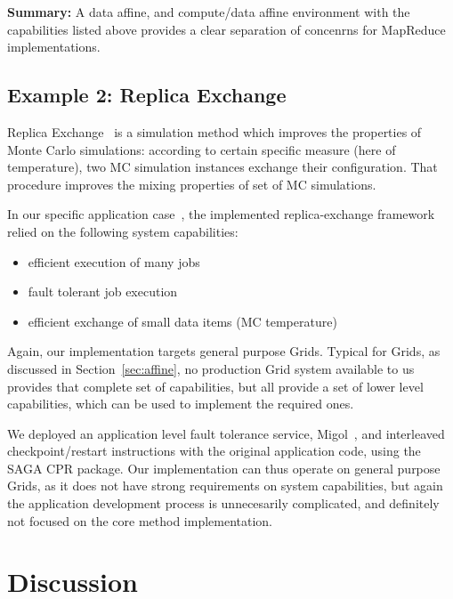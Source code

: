 \documentclass{article}
\newenvironment{shortlist}{
  \vspace*{-0.5em}
  \begin{itemize}
  \setlength{\itemsep}{-0.3em}
}{
  \end{itemize}
  \vspace*{-0.5em}
}
\newcommand{\B}[1]{\textbf{#1}}
\newcommand{\T}[1]{\texttt{#1}}
\begin{document}
  \B{Summary:} A data affine, and compute/data affine environment with
  the capabilities listed above provides a clear separation of
  concenrns for MapReduce implementations.


 \subsection{Example 2: Replica Exchange}

 Replica Exchange~\cite{repex} is a simulation method which improves
 the properties of Monte Carlo simulations: according to certain
 specific measure (here of temperature), two MC simulation instances
 exchange their configuration.  That procedure improves the mixing
 properties of set of MC
 simulations.%

In our specific application case~\cite{saga-migol-paper}, the
implemented replica-exchange framework relied on the following
system capabilities: 

  \begin{shortlist}
   \item efficient execution of many jobs
   \item fault tolerant job execution
   \item efficient exchange of small data items (MC temperature)
  \end{shortlist}

  Again, our implementation targets general purpose Grids.
  Typical for Grids, as discussed in Section~\ref{sec:affine},
  no production Grid system available to us provides that
  complete set of capabilities, but all provide a set of lower
  level capabilities, which can be used to implement the
  required ones.

  We deployed an application level fault tolerance service,
  Migol~\cite{migol}, and interleaved checkpoint/restart
  instructions with the original application code, using the
  SAGA CPR package.  Our implementation can thus operate on
  general purpose Grids, as it does not have strong requirements
  on system capabilities, but again the application development
  process is unnecesarily complicated, and definitely not
  focused on the core method implementation.

\section{Discussion}
\label{sec:discussion}
\end{document}
